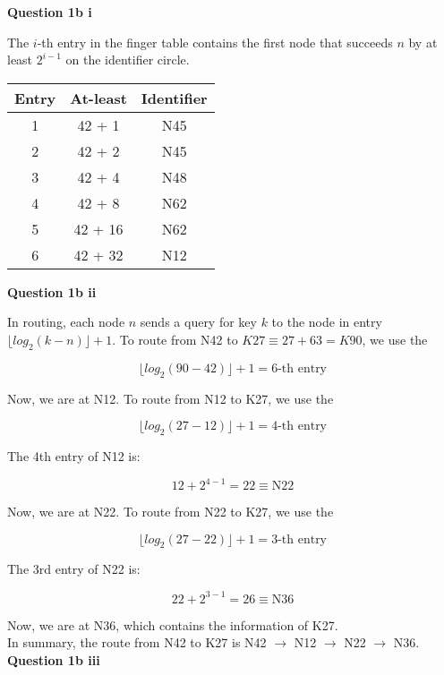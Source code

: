 \documentclass[11pt,a4paper]{report}
\begin{document}
\begin{multicols*}{2}
\noindent \textbf{Question 1b i}

\noindent The $i$-th entry in the finger table contains the first node that succeeds $n$ by at least $2^{i-1}$ on the identifier circle.

\begin{center}
\begin{tabular}{|c|c|c|}
  \hline
  Entry & At-least & Identifier \\ \hline
  1     & 42 + 1   & N45        \\
  2     & 42 + 2   & N45        \\
  3     & 42 + 4   & N48        \\
  4     & 42 + 8   & N62        \\
  5     & 42 + 16  & N62        \\
  6     & 42 + 32  & N12        \\ \hline
\end{tabular}
\end{center}

\noindent \textbf{Question 1b ii}

\noindent In routing, each node $n$ sends a query for key $k$ to the node in entry $\lfloor log_2(k-n) \rfloor + 1$. To route from N42 to $K27 \equiv 27 + 63 = K90$, we use the

$$\lfloor log_2(90-42) \rfloor + 1 = 6\text{-th entry}$$

\noindent Now, we are at N12. To route from N12 to K27, we use the

$$\lfloor log_2(27-12) \rfloor + 1 = 4\text{-th entry}$$

\noindent The 4th entry of N12 is:

$$12 + 2^{4-1} = 22 \equiv \text{N22}$$

\noindent Now, we are at N22. To route from N22 to K27, we use the

$$\lfloor log_2(27-22) \rfloor + 1 = 3\text{-th entry}$$

\noindent The 3rd entry of N22 is:

$$22 + 2^{3-1} = 26 \equiv \text{N36}$$

\noindent Now, we are at N36, which contains the information of K27. \\

\noindent In summary, the route from N42 to K27 is N42 $\rightarrow$ N12 $\rightarrow$ N22 $\rightarrow$ N36.\\

\noindent \textbf{Question 1b iii}


\end{multicols*}
\end{document}
